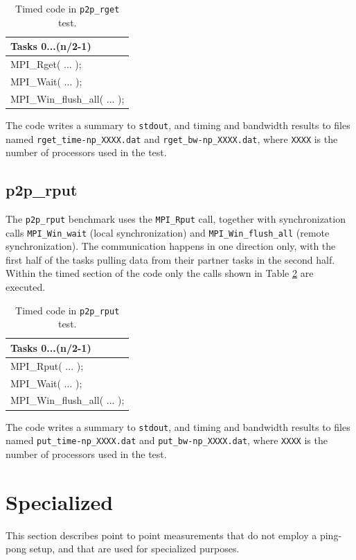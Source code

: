 \documentclass[10pt,a4paper]{report}
\begin{document}
\begin{table}[ht]
\centering
\caption{Timed code in \texttt{p2p\_rget} test.}
\label{tab:rget}
\begin{tabular}{|l|}
\hline
\bf{Tasks 0...(n/2-1)}	   \\\hline
MPI\_Rget( ... );           \\
MPI\_Wait( ... );           \\
MPI\_Win\_flush\_all( ... );\\\hline
\end{tabular}
\end{table}

The code writes a summary to \verb+stdout+, and timing and bandwidth results to files named \verb+rget_time-np_XXXX.dat+ and \verb+rget_bw-np_XXXX.dat+, where \verb+XXXX+ is the number of processors used in the test.

\FloatBarrier
\subsection{p2p\_rput}
The \verb+p2p_rput+ benchmark uses the \verb+MPI_Rput+ call, together with synchronization calls \verb+MPI_Win_wait+ (local synchronization) and \verb+MPI_Win_flush_all+ (remote synchronization). The communication happens in one direction only, with the first half of the tasks pulling data from their partner tasks in the second half. Within the timed section of the code only the calls shown in Table \ref{tab:rput} are executed.

\begin{table}[ht]
\centering
\caption{Timed code in \texttt{p2p\_rput} test.}
\label{tab:rput}
\begin{tabular}{|l|}
\hline
\bf{Tasks 0...(n/2-1)} \\\hline
MPI\_Rput( ... );      \\
MPI\_Wait( ... );      \\
MPI\_Win\_flush\_all( ... );\\\hline
\end{tabular}
\end{table}

The code writes a summary to \verb+stdout+, and timing and bandwidth results to files named \verb+put_time-np_XXXX.dat+ and \verb+put_bw-np_XXXX.dat+, where \verb+XXXX+ is the number of processors used in the test.

\section{Specialized}
This section describes point to point measurements that do not employ a ping-pong setup, and that are used for specialized purposes.
\end{document}
